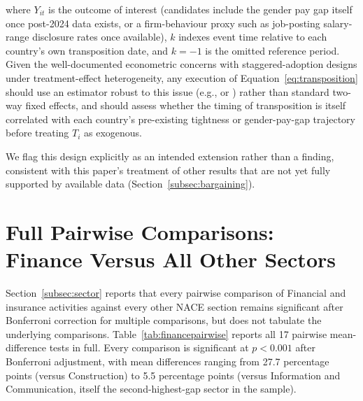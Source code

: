 \documentclass[12pt,a4paper]{article}
\begin{document}
\noindent where $Y_{it}$ is the outcome of interest (candidates include the
gender pay gap itself once post-2024 data exists, or a firm-behaviour proxy
such as job-posting salary-range disclosure rates once available), $k$
indexes event time relative to each country's own transposition date, and
$k=-1$ is the omitted reference period.  Given the well-documented
econometric concerns with staggered-adoption designs under
treatment-effect heterogeneity, any execution of Equation~\ref{eq:transposition}
should use an estimator robust to this issue (e.g., \citealt{CallawaySantAnna2021}
or \citealt{SunAbraham2021}) rather than standard two-way fixed effects, and
should assess whether the timing of transposition is itself correlated with
each country's pre-existing tightness or gender-pay-gap trajectory before
treating $T_i$ as exogenous.

We flag this design explicitly as an intended extension rather than a
finding, consistent with this paper's treatment of other results that are
not yet fully supported by available data (Section~\ref{subsec:bargaining}).

\section{Full Pairwise Comparisons: Finance Versus All Other Sectors}
\label{sec:appendixC}

Section~\ref{subsec:sector} reports that every pairwise comparison of
Financial and insurance activities against every other NACE section remains
significant after Bonferroni correction for multiple comparisons, but does not
tabulate the underlying comparisons.  Table~\ref{tab:financepairwise} reports
all 17 pairwise mean-difference tests in full.  Every comparison is significant
at $p<0.001$ after Bonferroni adjustment, with mean differences ranging from
27.7 percentage points (versus Construction) to 5.5 percentage points (versus
Information and Communication, itself the second-highest-gap sector in the
sample).
\end{document}
